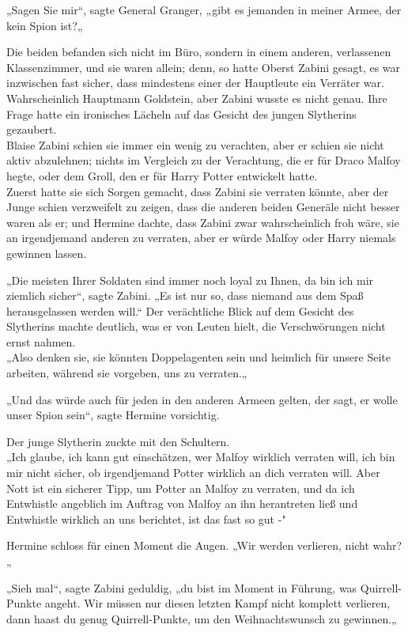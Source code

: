 {„Sagen Sie mir“, sagte General Granger, „gibt es jemanden in meiner Armee, der kein Spion ist?„

Die beiden befanden sich nicht im Büro, sondern in einem anderen, verlassenen Klassenzimmer, und sie waren allein; denn, so hatte Oberst Zabini gesagt, es war inzwischen fast sicher, dass mindestens einer der Hauptleute ein Verräter war.\\ Wahrscheinlich Hauptmann Goldstein, aber Zabini wusste es nicht genau. Ihre Frage hatte ein ironisches Lächeln auf das Gesicht des jungen Slytherins gezaubert.\\ Blaise Zabini schien sie immer ein wenig zu verachten, aber er schien sie nicht aktiv abzulehnen; nichts im Vergleich zu der Verachtung, die er für Draco Malfoy hegte, oder dem Groll, den er für Harry Potter entwickelt hatte.\\ Zuerst hatte sie sich Sorgen gemacht, dass Zabini sie verraten könnte, aber der Junge schien verzweifelt zu zeigen, dass die anderen beiden Generäle nicht besser waren als er; und Hermine dachte, dass Zabini zwar wahrscheinlich froh wäre, sie an irgendjemand anderen zu verraten, aber er würde Malfoy oder Harry niemals gewinnen lassen.

„Die meisten Ihrer Soldaten sind immer noch loyal zu Ihnen, da bin ich mir ziemlich sicher“, sagte Zabini. „Es ist nur so, dass niemand aus dem Spaß herausgelassen werden will.“ Der verächtliche Blick auf dem Gesicht des Slytherins machte deutlich, was er von Leuten hielt, die Verschwörungen nicht ernst nahmen.\\ „Also denken sie, sie könnten Doppelagenten sein und heimlich für unsere Seite arbeiten, während sie vorgeben, uns zu verraten.„

„Und das würde auch für jeden in den anderen Armeen gelten, der sagt, er wolle unser Spion sein“, sagte Hermine vorsichtig.

Der junge Slytherin zuckte mit den Schultern.\\ „Ich glaube, ich kann gut einschätzen, wer Malfoy wirklich verraten will, ich bin mir nicht sicher, ob irgendjemand Potter wirklich an dich verraten will. Aber Nott ist ein sicherer Tipp, um Potter an Malfoy zu verraten, und da ich Entwhistle angeblich im Auftrag von Malfoy an ihn herantreten ließ und Entwhistle wirklich an uns berichtet, ist das fast so gut -"

Hermine schloss für einen Moment die Augen. „Wir werden verlieren, nicht wahr?„

„Sieh mal“, sagte Zabini geduldig, „du bist im Moment in Führung, was Quirrell-Punkte angeht. Wir müssen nur diesen letzten Kampf nicht komplett verlieren, dann haast du genug Quirrell-Punkte, um den Weihnachtswunsch zu gewinnen.„

}
